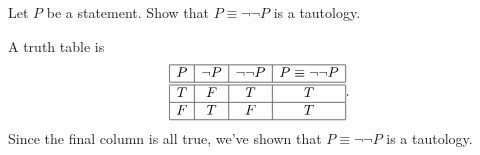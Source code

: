 \documentclass[12pt,answers]{exam}
\begin{document}
\begin{questions}
\question [2] Let $P$ be a statement. Show that $P \equiv \lnot \lnot P$ is a tautology.

\begin{solution}
A truth table is
\[
\begin{array}{|c | c |  c | c|} \hline
P & \lnot P & \lnot \lnot P & P \equiv \lnot \lnot P  \\ \hline \hline
T  & F & T & T \\ \hline
F  & T & F & T \\ \hline
\end{array}.
\]
Since the final column is all true, we've shown that $P \equiv \lnot \lnot P$ is a tautology.
\end{solution}

\end{questions}
\end{document}

